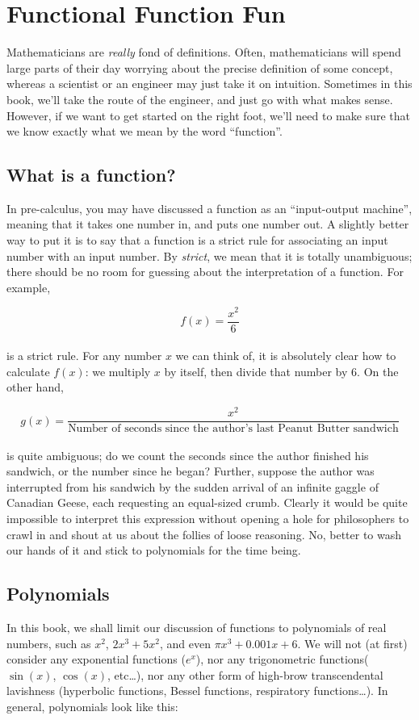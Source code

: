 \chapter{Functional Function Fun}
\label{chap:Functions}

Mathematicians are \emph{really} fond of definitions. Often, mathematicians will spend large parts of their day worrying about the precise definition of some concept, whereas a scientist or an engineer may just take it on intuition. Sometimes in this book, we'll take the route of the engineer, and just go with what makes sense. However, if we want to get started on the right foot, we'll need to make sure that we know exactly what we mean by the word ``function''.

\section{What is a function?}
In pre-calculus, you may have discussed a function as an ``input-output machine'', meaning that it takes one number in, and puts one number out. A slightly better way to put it is to say that a function is a strict rule for associating an input number with an input number. By \emph{strict}, we mean that it is totally unambiguous; there should be no room for guessing about the interpretation of a function. For example,

\[f(x) = \frac{x^2}{6}\]\\

is a strict rule. For any number $x$ we can think of, it is absolutely clear how to calculate $f(x)$: we multiply $x$ by itself, then divide that number by $6$. On the other hand,

\[g(x) = \frac{x^2}{\text{Number of seconds since the author's last Peanut Butter sandwich}}\]\\

is quite ambiguous; do we count the seconds since the author finished his sandwich, or the number since he began? Further, suppose the author was interrupted from his sandwich by the sudden arrival of an infinite gaggle of Canadian Geese, each requesting an equal-sized crumb. Clearly it would be quite impossible to interpret this expression without opening a hole for philosophers to crawl in and shout at us about the follies of loose reasoning. No, better to wash our hands of it and stick to polynomials for the time being. 

\section{Polynomials}
In this book, we shall limit our discussion of functions to polynomials of real numbers, such as $x^2$, $2x^3 + 5x^2$, and even $\pi x^3 + 0.001x + 6$. We will not (at first) consider any exponential functions ($e^x$), nor any trigonometric functions($\sin(x)$, $\cos(x)$, etc\ldots), nor any other form of high-brow transcendental lavishness (hyperbolic functions, Bessel functions, respiratory functions\ldots). In general, polynomials look like this:

